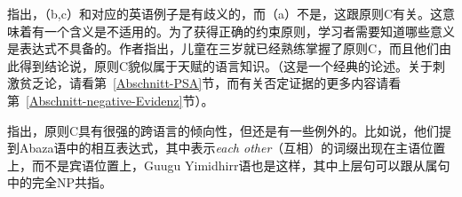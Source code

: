 \citet*[]{CTK2009a} 指出，（b,c）和对应的英语例子是有歧义的，而（a）不是，这跟原则C有关。这意味着有一个含义是不适用的。为了获得正确的约束原则，学习者需要知道哪些意义是表达式不具备的。作者指出，儿童在三岁就已经熟练掌握了原则C，而且他们由此得到结论说，原则C貌似属于天赋的语言知识。（这是一个经典的论述。关于刺激贫乏论，请看第~\ref{Abschnitt-PSA}节，而有关否定证据的更多内容请看第~\ref{Abschnitt-negative-Evidenz}节）。

\citet[]{EL2009b}指出，原则C具有很强的跨语言的倾向性，但还是有一些例外的。比如说，他们提到Abaza语中的相互表达式，其中表示\emph{each other}（互相）的词缀出现在主语位置上，而不是宾语位置上，Guugu Yimidhirr语也是这样，其中上层句可以跟从属句中的完全NP共指。

